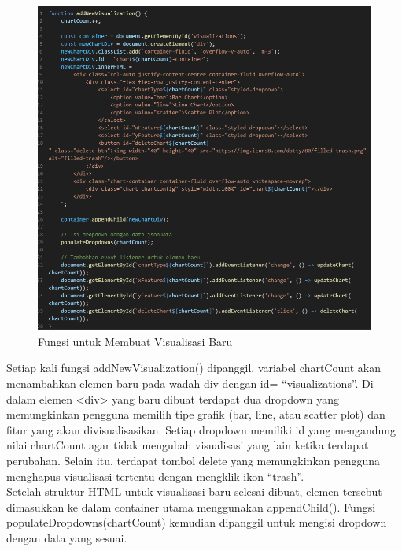 \begin{enumerate}[label={\alph*.}]
	\begin{figure}[H]
		\centering
		\includegraphics[width=0.8\linewidth]{gambar/Pembahasan/Fungsi new visualization.png}
		\caption{Fungsi untuk Membuat Visualisasi Baru}
		\label{Fungsi untuk Membuat Visualisasi Baru}
	\end{figure}
	Setiap kali fungsi addNewVisualization() dipanggil, variabel chartCount akan menambahkan elemen baru pada wadah div dengan id= “visualizations”. Di dalam elemen <div> yang baru dibuat terdapat dua dropdown yang memungkinkan pengguna memilih tipe grafik (bar, line, atau scatter plot) dan fitur yang akan divisualisasikan. Setiap dropdown memiliki id yang mengandung nilai chartCount agar tidak mengubah visualisasi yang lain ketika terdapat perubahan. Selain itu, terdapat tombol delete yang memungkinkan pengguna menghapus visualisasi tertentu dengan mengklik ikon “trash”.\\
	Setelah struktur HTML untuk visualisasi baru selesai dibuat, elemen tersebut dimasukkan ke dalam container utama menggunakan appendChild(). Fungsi populateDropdowns(chartCount) kemudian dipanggil untuk mengisi dropdown dengan data yang sesuai. 
	

\end{enumerate}

